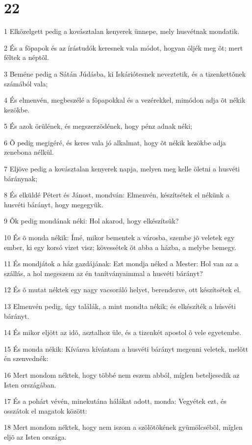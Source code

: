 \chapter{22}

\par 1 Elközelgett pedig a kovásztalan kenyerek ünnepe, mely husvétnak mondatik.
\par 2 És a fõpapok és az írástudók keresnek vala módot, hogyan öljék meg õt; mert féltek a néptõl.
\par 3 Beméne pedig a Sátán Júdásba, ki Iskáriótesnek neveztetik, és a tizenkettõnek számából vala;
\par 4 És elmenvén, megbeszélé a fõpapokkal és a vezérekkel, mimódon adja õt nékik kezökbe.
\par 5 És azok örülének, és megszerzõdének, hogy pénz adnak néki;
\par 6 Õ pedig megigéré, és keres vala jó alkalmat, hogy õt nékik kezökbe adja zenebona nélkül.
\par 7 Eljöve pedig a kovásztalan kenyerek napja, melyen meg kelle öletni a husvéti báránynak;
\par 8 És elküldé Pétert és Jánost, mondván: Elmenvén, készítsétek el nékünk a husvéti bárányt, hogy megegyük.
\par 9 Õk pedig mondának néki: Hol akarod, hogy elkészítsük?
\par 10 És õ monda nékik: Ímé, mikor bementek a városba, szembe jõ veletek egy ember, ki egy korsó vizet visz; kövessétek õt abba a házba, a melybe bemegy.
\par 11 És mondjátok a ház gazdájának: Ezt mondja néked a Mester: Hol van az a szállás, a hol megeszem az én tanítványaimmal a husvéti bárányt?
\par 12 És õ mutat néktek egy nagy vacsoráló helyet, berendezve, ott készítsétek el.
\par 13 Elmenvén pedig, úgy találák, a mint mondta nékik; és elkészíték a húsvéti bárányt.
\par 14 És mikor eljött az idõ, asztalhoz üle, és a tizenkét apostol õ vele egyetembe.
\par 15 És monda nékik: Kívánva kívántam a husvéti bárányt megenni veletek, melõtt én szenvednék:
\par 16 Mert mondom néktek, hogy többé nem eszem abból, míglen beteljesedik az Isten országában.
\par 17 És a pohárt vévén, minekutána hálákat adott, monda: Vegyétek ezt, és osszátok el magatok között:
\par 18 Mert mondom néktek, hogy nem iszom a szõlõtõkének gyümölcsébõl, míglen eljõ az Isten országa.
